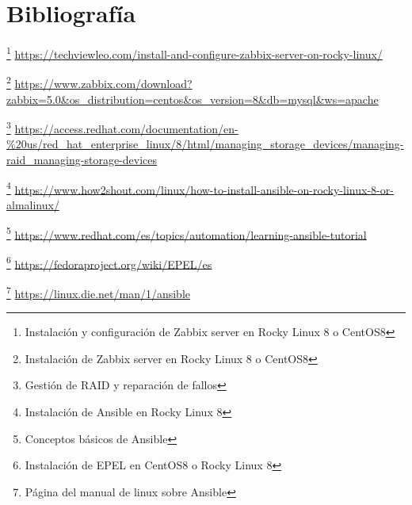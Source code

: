 \newpage
\section{Bibliografía}

\footnote{Instalación y configuración de Zabbix server en Rocky Linux 8 o CentOS8}
\textcolor{blue}{\url{https://techviewleo.com/install-and-configure-zabbix-server-on-rocky-linux/}}

\footnote{Instalación de Zabbix server en Rocky Linux 8 o CentOS8}
\textcolor{blue}{\url{https://www.zabbix.com/download?zabbix=5.0\&os_distribution=centos&os_version=8\&db=mysql\&ws=apache}}

\footnote{Gestión de RAID y reparación de fallos}
\textcolor{blue}{\url{https://access.redhat.com/documentation/en-\%20us/red\_hat\_enterprise\_linux/8/html/managing\_storage\_devices/managing-raid\_managing-storage-devices}}

\footnote{Instalación de Ansible en Rocky Linux 8}
\textcolor{blue}{\url{https://www.how2shout.com/linux/how-to-install-ansible-on-rocky-linux-8-or-almalinux/}}

\footnote{Conceptos básicos de Ansible}
\textcolor{blue}{\url{https://www.redhat.com/es/topics/automation/learning-ansible-tutorial}}

\footnote{Instalación de EPEL en CentOS8 o Rocky Linux 8}
\textcolor{blue}{\url{https://fedoraproject.org/wiki/EPEL/es}}

\footnote{Página del manual de linux sobre Ansible}
\textcolor{blue}{\url{https://linux.die.net/man/1/ansible}}

